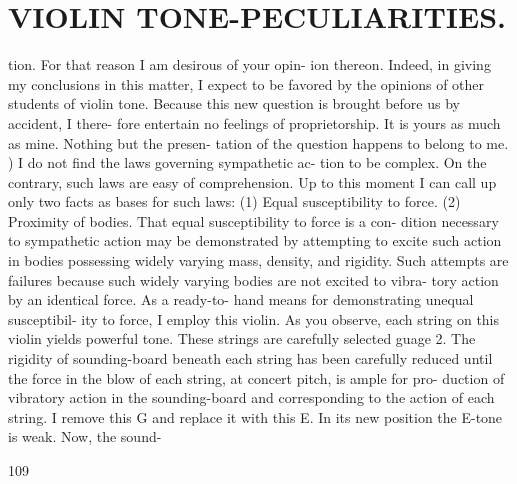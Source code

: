 \documentclass{article}
\begin{document}
\section*{VIOLIN TONE-PECULIARITIES.}
tion. For that reason I am desirous of your opin- ion thereon. Indeed, in giving my conclusions in this matter, I expect to be favored by the opinions of other students of violin tone. Because this new question is brought before us by accident, I there- fore entertain no feelings of proprietorship. It is yours as much as mine. Nothing but the presen- tation of the question happens to belong to me. ) I do not find the laws governing sympathetic ac- tion to be complex. On the contrary, such laws are easy of comprehension. Up to this moment I can call up only two facts as bases for such laws: (1) Equal susceptibility to force. (2) Proximity of bodies. That equal susceptibility to force is a con- dition necessary to sympathetic action may be demonstrated by attempting to excite such action in bodies possessing widely varying mass, density, and rigidity. Such attempts are failures because such widely varying bodies are not excited to vibra- tory action by an identical force. As a ready-to- hand means for demonstrating unequal susceptibil- ity to force, I employ this violin. As you observe, each string on this violin yields powerful tone. These strings are carefully selected guage 2. The rigidity of sounding-board beneath each string has been carefully reduced until the force in the blow of each string, at concert pitch, is ample for pro- duction of vibratory action in the sounding-board and corresponding to the action of each string. I remove this G and replace it with this E. In its new position the E-tone is weak. Now, the sound-

109
\end{document}
